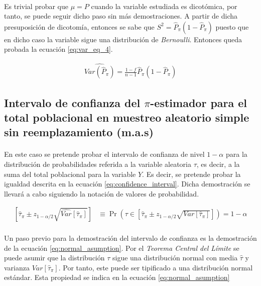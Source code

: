 \documentclass{article}
\begin{document}
      \paragraph{}
      Es trivial probar que $\mu = P$ cuando la variable estudiada es dicotómica, por tanto, se puede seguir dicho paso sin más demostraciones. A partir de dicha presuposición de dicotomía, entonces se sabe que $S^2=\widehat{P}_\pi(1-\widehat{P}_\pi)$ puesto que en dicho caso la variable sigue una distribución de \emph{Bernoulli}. Entonces queda probada la ecuación \eqref{eq:var_eq_4}.

      \begin{align}
      \label{eq:var_eq_4}
        \widehat{Var(\widehat{P}_\pi)} = \frac{1-f}{n-1}\widehat{P}_\pi(1-\widehat{P}_\pi)
      \end{align}

    \subsection{Intervalo de confianza del $\pi$-estimador para el total poblacional en muestreo aleatorio simple sin reemplazamiento (m.a.s)}

      \paragraph{}
      En este caso se pretende probar el intervalo de confianza de nivel $1-\alpha$ para la distribución de probabilidades referida a la variable aleatoria $\tau$, es decir, a la suma del total poblacional para la variable $Y$. Es decir, se pretende probar la igualdad descrita en la ecuación \eqref{eq:confidence_interval}. Dicha demostración se llevará a cabo siguiendo la notación de valores de probabilidad.

      \begin{align}
      \label{eq:confidence_interval}
        \left[\widehat{\tau}_\pi \pm z_{1-\alpha/2}\sqrt{\widehat{Var}[\widehat{\tau}_\pi]}\right] &\equiv \Pr\left(\tau\in \left[\widehat{\tau}_\pi \pm z_{1-\alpha/2}\sqrt{Var[\widehat{\tau}_\pi]}\right]\right) = 1-\alpha
      \end{align}

      \paragraph{}
      Un paso previo para la demostración del intervalo de confianza es la demostración de la ecuación \eqref{eq:normal_asumption}. Por el \emph{Teorema Central del Límite} se puede asumir que la distribución $\tau$ sigue una distribución normal con media $\widehat{\tau}$ y varianza $Var[\widehat{\tau}_\pi]$. Por tanto, este puede ser tipificado a una distribución normal estándar. Esta propiedad se indica en la ecuación \eqref{eq:normal_asumption}
\end{document}
